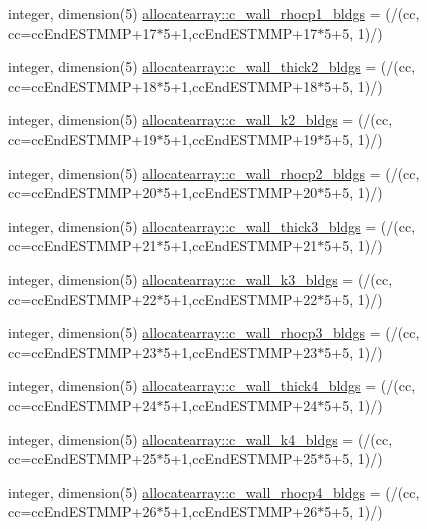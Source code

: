 \begin{DoxyCompactItemize}
\item 
integer, dimension(5) \hyperlink{namespaceallocatearray_a5824f50ff58d28c3b0b4326a2ccfe541}{allocatearray\+::c\+\_\+wall\+\_\+rhocp1\+\_\+bldgs} = (/(cc, cc=cc\+End\+E\+S\+T\+M\+MP+17$\ast$5+1,cc\+End\+E\+S\+T\+M\+MP+17$\ast$5+5, 1)/)
\item 
integer, dimension(5) \hyperlink{namespaceallocatearray_afa52a2b3030dd70bca77ed4c1a0d4717}{allocatearray\+::c\+\_\+wall\+\_\+thick2\+\_\+bldgs} = (/(cc, cc=cc\+End\+E\+S\+T\+M\+MP+18$\ast$5+1,cc\+End\+E\+S\+T\+M\+MP+18$\ast$5+5, 1)/)
\item 
integer, dimension(5) \hyperlink{namespaceallocatearray_aa1c4bb9d1b4557d6980c73a3c27feba8}{allocatearray\+::c\+\_\+wall\+\_\+k2\+\_\+bldgs} = (/(cc, cc=cc\+End\+E\+S\+T\+M\+MP+19$\ast$5+1,cc\+End\+E\+S\+T\+M\+MP+19$\ast$5+5, 1)/)
\item 
integer, dimension(5) \hyperlink{namespaceallocatearray_af8543b34d920034e2761a01b4e6f1db5}{allocatearray\+::c\+\_\+wall\+\_\+rhocp2\+\_\+bldgs} = (/(cc, cc=cc\+End\+E\+S\+T\+M\+MP+20$\ast$5+1,cc\+End\+E\+S\+T\+M\+MP+20$\ast$5+5, 1)/)
\item 
integer, dimension(5) \hyperlink{namespaceallocatearray_afeb16544bc15664add2e4c9c69fff38a}{allocatearray\+::c\+\_\+wall\+\_\+thick3\+\_\+bldgs} = (/(cc, cc=cc\+End\+E\+S\+T\+M\+MP+21$\ast$5+1,cc\+End\+E\+S\+T\+M\+MP+21$\ast$5+5, 1)/)
\item 
integer, dimension(5) \hyperlink{namespaceallocatearray_a50381945e556319590186a7bd7c04cd6}{allocatearray\+::c\+\_\+wall\+\_\+k3\+\_\+bldgs} = (/(cc, cc=cc\+End\+E\+S\+T\+M\+MP+22$\ast$5+1,cc\+End\+E\+S\+T\+M\+MP+22$\ast$5+5, 1)/)
\item 
integer, dimension(5) \hyperlink{namespaceallocatearray_a60eaef231cee8d3b58a1c5284dd51d4c}{allocatearray\+::c\+\_\+wall\+\_\+rhocp3\+\_\+bldgs} = (/(cc, cc=cc\+End\+E\+S\+T\+M\+MP+23$\ast$5+1,cc\+End\+E\+S\+T\+M\+MP+23$\ast$5+5, 1)/)
\item 
integer, dimension(5) \hyperlink{namespaceallocatearray_a044a0c470735dd407e5d5fb0a536540a}{allocatearray\+::c\+\_\+wall\+\_\+thick4\+\_\+bldgs} = (/(cc, cc=cc\+End\+E\+S\+T\+M\+MP+24$\ast$5+1,cc\+End\+E\+S\+T\+M\+MP+24$\ast$5+5, 1)/)
\item 
integer, dimension(5) \hyperlink{namespaceallocatearray_ae9a73533916e4cc62f3cec0c85f0d985}{allocatearray\+::c\+\_\+wall\+\_\+k4\+\_\+bldgs} = (/(cc, cc=cc\+End\+E\+S\+T\+M\+MP+25$\ast$5+1,cc\+End\+E\+S\+T\+M\+MP+25$\ast$5+5, 1)/)
\item 
integer, dimension(5) \hyperlink{namespaceallocatearray_ae0bee70a024e2e4204e3c0e2ea43fe0c}{allocatearray\+::c\+\_\+wall\+\_\+rhocp4\+\_\+bldgs} = (/(cc, cc=cc\+End\+E\+S\+T\+M\+MP+26$\ast$5+1,cc\+End\+E\+S\+T\+M\+MP+26$\ast$5+5, 1)/)

\end{DoxyCompactItemize}
